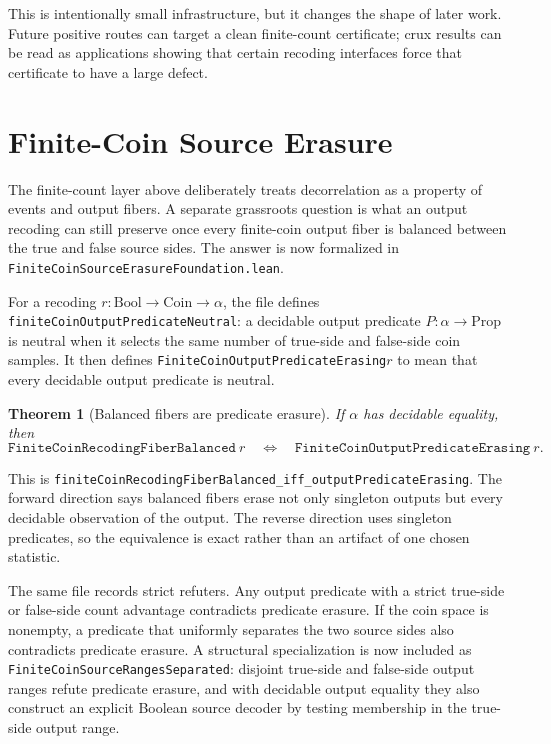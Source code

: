 \documentclass[11pt]{article}
\newtheorem{theorem}{Theorem}[section]
\theoremstyle{remark}
\begin{document}
This is intentionally small infrastructure, but it changes the shape of later
work.  Future positive routes can target a clean finite-count certificate; crux
results can be read as applications showing that certain recoding interfaces
force that certificate to have a large defect.

\section{Finite-Coin Source Erasure}

The finite-count layer above deliberately treats decorrelation as a property of
events and output fibers.  A separate grassroots question is what an output
recoding can still preserve once every finite-coin output fiber is balanced
between the true and false source sides.  The answer is now formalized in
\texttt{FiniteCoinSourceErasureFoundation.lean}.

For a recoding \(r : \mathrm{Bool} \to \mathrm{Coin} \to \alpha\), the file
defines \texttt{finiteCoinOutputPredicateNeutral}: a decidable output predicate
\(P : \alpha \to \mathrm{Prop}\) is neutral when it selects the same number of
true-side and false-side coin samples.  It then defines
\texttt{FiniteCoinOutputPredicateErasing}\(r\) to mean that every decidable
output predicate is neutral.

\begin{theorem}[Balanced fibers are predicate erasure]
If \(\alpha\) has decidable equality, then
\[
  \texttt{FiniteCoinRecodingFiberBalanced}\ r
  \quad\Longleftrightarrow\quad
  \texttt{FiniteCoinOutputPredicateErasing}\ r.
\]
\end{theorem}

\noindent
This is
\texttt{finiteCoinRecodingFiberBalanced\_iff\_outputPredicateErasing}.  The
forward direction says balanced fibers erase not only singleton outputs but every
decidable observation of the output.  The reverse direction uses singleton
predicates, so the equivalence is exact rather than an artifact of one chosen
statistic.

The same file records strict refuters.  Any output predicate with a strict
true-side or false-side count advantage contradicts predicate erasure.  If the
coin space is nonempty, a predicate that uniformly separates the two source
sides also contradicts predicate erasure.  A structural specialization is now
included as \texttt{FiniteCoinSourceRangesSeparated}: disjoint true-side and
false-side output ranges refute predicate erasure, and with decidable output
equality they also construct an explicit Boolean source decoder by testing
membership in the true-side output range.
\end{document}
